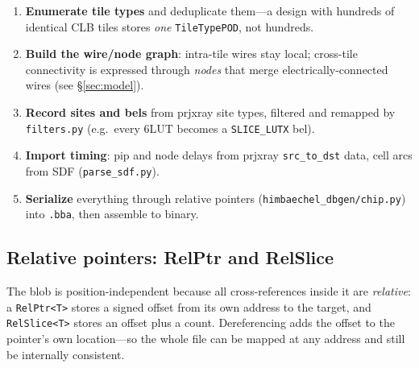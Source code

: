\documentclass[11pt,a4paper]{article}
\begin{document}
\begin{enumerate}
\item \textbf{Enumerate tile types} and deduplicate them---a design with
  hundreds of identical CLB tiles stores \emph{one} \texttt{TileTypePOD},
  not hundreds.
\item \textbf{Build the wire/node graph}: intra-tile wires stay local;
  cross-tile connectivity is expressed through \emph{nodes} that merge
  electrically-connected wires (see \S\ref{sec:model}).
\item \textbf{Record sites and bels} from prjxray site types, filtered
  and remapped by \texttt{filters.py} (e.g.\ every 6LUT becomes a
  \texttt{SLICE\_LUTX} bel).
\item \textbf{Import timing}: pip and node delays from prjxray
  \texttt{src\_to\_dst} data, cell arcs from SDF
  (\texttt{parse\_sdf.py}).
\item \textbf{Serialize} everything through relative pointers
  (\texttt{himbaechel\_dbgen/chip.py}) into \texttt{.bba}, then
  assemble to binary.
\end{enumerate}

\subsection{Relative pointers: RelPtr and RelSlice}

The blob is position-independent because all cross-references inside it
are \emph{relative}: a \texttt{RelPtr<T>} stores a signed offset from
its own address to the target, and \texttt{RelSlice<T>} stores an
offset plus a count. Dereferencing adds the offset to the pointer's own
location---so the whole file can be mapped at any address and still be
internally consistent.
\end{document}
